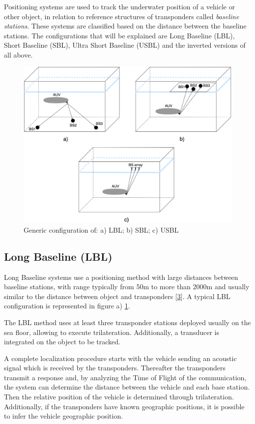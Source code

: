 Positioning systems are used to track the underwater position of a vehicle or other object, in relation to reference structures of transponders called \textit{baseline stations}. These systems are classified based on the distance between the baseline stations. The configurations that will be explained are Long Baseline (LBL), Short Baseline (SBL), Ultra Short Baseline (USBL) and the inverted versions of all above.

\begin{figure}[!htbp]
	\centering
	\includegraphics[width=1\textwidth]{figures/lblsblusbl}
	\caption{Generic configuration of: a) LBL; b) SBL; c) USBL}
	\label{fig:lblsblusbl}
\end{figure}

\subsection{Long Baseline (LBL)}

Long Baseline systems use a positioning method with large distances between baseline stations, with range typically from 50m to more than 2000m  and usually similar to the distance between object and transponders [\hyperref[r:survey-tech-chall]{3}]. A typical LBL configuration is represented in figure a) \ref{fig:lblsblusbl}.

The LBL method uses at least three transponder stations deployed usually on the sea floor, allowing to execute trilateration. Additionally, a transducer is integrated on the object to be tracked. 

A complete localization procedure starts with the vehicle sending an acoustic signal which is received by the transponders. Thereafter the transponders transmit a response and, by analyzing the Time of Flight of the communication, the system can determine the distance between the vehicle and each base station. Then the relative position of the vehicle is determined through trilateration. Additionally, if the transponders have known geographic positions, it is possible to infer the vehicle geographic position. 


